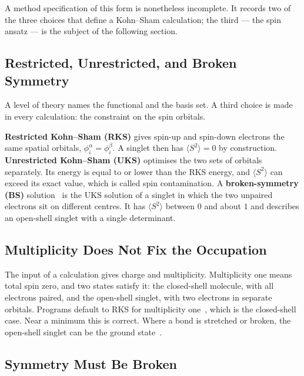 A method specification of this form is nonetheless incomplete. It records two of
the three choices that define a Kohn--Sham calculation; the third --- the spin
ansatz --- is the subject of the following section.

\subsection{Restricted, Unrestricted, and Broken Symmetry}
\label{sec:background-spin}

A level of theory names the functional and the basis set. A third choice is
made in every calculation: the constraint on the spin orbitals.

\textbf{Restricted Kohn--Sham (RKS)} gives spin-up and spin-down electrons
the same spatial orbitals, $\phi_i^\alpha = \phi_i^\beta$. A singlet then has
$\langle S^2 \rangle = 0$ by construction. \textbf{Unrestricted Kohn--Sham
(UKS)} optimises the two sets of orbitals separately. Its energy is equal to
or lower than the RKS energy, and $\langle S^2 \rangle$ can exceed its exact
value, which is called spin contamination. A \textbf{broken-symmetry (BS)}
solution~\cite{noodleman1981} is the UKS solution of a singlet in which the
two unpaired electrons sit on different centres. It has $\langle S^2
\rangle$ between $0$ and about $1$ and describes an open-shell singlet with a
single determinant.

\subsection{Multiplicity Does Not Fix the Occupation}
\label{sec:background-multiplicity}

The input of a calculation gives charge and multiplicity. Multiplicity one
means total spin zero, and two states satisfy it: the closed-shell molecule,
with all electrons paired, and the open-shell singlet, with two electrons in
separate orbitals. Programs default to RKS for multiplicity
one~\cite{orca_manual, qchem_manual}, which is the closed-shell case. Near a
minimum this is correct. Where a bond is stretched or broken, the open-shell
singlet can be the ground state~\cite{bursch2022}.

\subsection{Symmetry Must Be Broken}
\label{sec:background-breaking}

